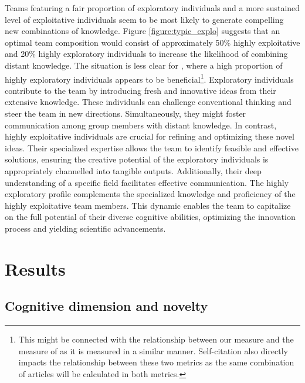 Teams featuring a fair proportion of exploratory individuals and a more sustained level of exploitative individuals seem to be most likely to generate compelling new combinations of knowledge. Figure \ref{figure:typic_explo} suggests that an optimal team composition would consist of approximately 50\% highly exploitative and 20\% highly exploratory individuals to increase the likelihood of combining distant knowledge. The situation is less clear for \cite{shibayama2021measuring}, where a high proportion of highly exploratory individuals appears to be beneficial\footnote{ \justifying This might be connected with the relationship between our measure and the measure of \cite{shibayama2021measuring} as it is measured in a similar manner. Self-citation also directly impacts the relationship between these two metrics as the same combination of articles will be calculated in both metrics.}. Exploratory individuals contribute to the team by introducing fresh and innovative ideas from their extensive knowledge. These individuals can challenge conventional thinking and steer the team in new directions. Simultaneously, they might foster communication among group members with distant knowledge. In contrast, highly exploitative individuals are crucial for refining and optimizing these novel ideas. Their specialized expertise allows the team to identify feasible and effective solutions, ensuring the creative potential of the exploratory individuals is appropriately channelled into tangible outputs. Additionally, their deep understanding of a specific field facilitates effective communication. The highly exploratory profile complements the specialized knowledge and proficiency of the highly exploitative team members. This dynamic enables the team to capitalize on the full potential of their diverse cognitive abilities, optimizing the innovation process and yielding scientific advancements.



\section{Results}
\label{results}
        

\subsection{Cognitive dimension and novelty} 
